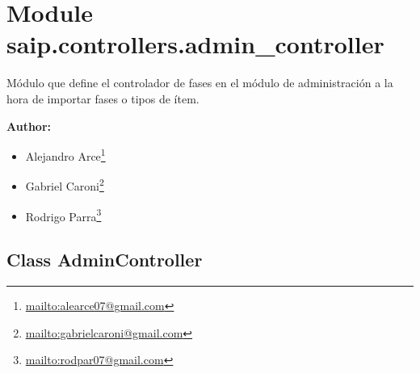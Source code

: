 %
%
%


\section{Module saip.controllers.admin\_controller}

    \label{saip:controllers:admin_controller}
Módulo que define el controlador de fases en el módulo de administración a 
la hora de importar fases o tipos de ítem.

\textbf{Author:} \begin{itemize}
\setlength{\parskip}{0.6ex}
  \item Alejandro 
    Arce\footnote{\href{mailto:alearce07@gmail.com}{mailto:alearce07@gmail.com}}

  \item Gabriel 
    Caroni\footnote{\href{mailto:gabrielcaroni@gmail.com}{mailto:gabrielcaroni@gmail.com}}

  \item Rodrigo 
    Parra\footnote{\href{mailto:rodpar07@gmail.com}{mailto:rodpar07@gmail.com}}

\end{itemize}





\subsection{Class AdminController}

